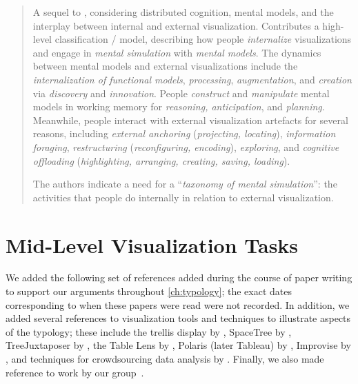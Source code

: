 \begin{quotation}
    A sequel to \citet{Liu2008}, considering distributed cognition, mental models, and the interplay between internal and external visualization.
    Contributes a high-level classification / model, describing how people {\it internalize} visualizations and engage in {\it mental simulation} with {\it mental models}.
    The dynamics between mental models and external visualizations include the {\it internalization of functional models}, {\it processing}, {\it augmentation}, and {\it creation} via {\it discovery} and {\it innovation}.
    People {\it construct} and {\it manipulate} mental models in working memory for {\it reasoning, anticipation}, and {\it planning}.
    Meanwhile, people interact with external visualization artefacts for several reasons, including {\it external anchoring} ({\it projecting, locating}), {\it information foraging}, {\it restructuring} ({\it reconfiguring, encoding}), {\it exploring}, and {\it cognitive offloading} ({\it highlighting, arranging, creating, saving, loading}). 
    
    The authors indicate a need for a ``{\it taxonomy of mental simulation}'': the activities that people do internally in relation to external visualization.
\end{quotation}


\section{Mid-Level Visualization Tasks}
\label{app:typology:chronology:draft}


We added the following set of references added during the course of paper writing to support our arguments throughout \autoref{ch:typology}; the exact dates corresponding to when these papers were read were not recorded.
In addition, we added several references to visualization tools and techniques to illustrate aspects of the typology; these include the trellis display by \citet{Becker1996}, SpaceTree by \citet{Grosjean2002}, TreeJuxtaposer by \citet{Munzner2003}, the Table Lens by \citet{Rao1994}, Polaris (later Tableau) by \citet{Stolte2002}, Improvise by \citet{Weaver2007}, and techniques for crowdsourcing data analysis by \citet{Willett2012}.
Finally, we also made reference to work by our group~\cite{Meyer2012,Meyer2015,Munzner2009,Munzner2009a,Munzner2014,Sedlmair2012}.

